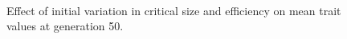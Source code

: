 \begin{figure}[p]
  \\
  \caption{Effect of initial variation in critical size and efficiency on mean trait values at generation 50.}
  \label{fig:ivar_mc_eff}
\end{figure}

\newpage
